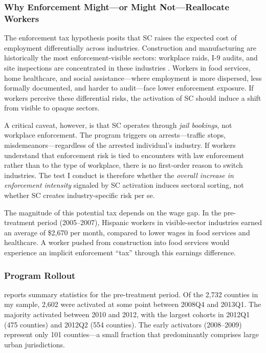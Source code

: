 \documentclass[12pt]{article}
\begin{document}
\subsubsection*{Why Enforcement Might---or Might Not---Reallocate Workers} The enforcement tax hypothesis posits that SC raises the expected cost of employment differentially across industries. Construction and manufacturing are historically the most enforcement-visible sectors: workplace raids, I-9 audits, and site inspections are concentrated in these industries \citep{borjas2017labor}. Workers in food services, home healthcare, and social assistance---where employment is more dispersed, less formally documented, and harder to audit---face lower enforcement exposure. If workers perceive these differential risks, the activation of SC should induce a shift from visible to opaque sectors.

A critical caveat, however, is that SC operates through \textit{jail bookings}, not workplace enforcement. The program triggers on arrests---traffic stops, misdemeanors---regardless of the arrested individual's industry. If workers understand that enforcement risk is tied to encounters with law enforcement rather than to the type of workplace, there is no first-order reason to switch industries. The test I conduct is therefore whether the \textit{overall increase in enforcement intensity} signaled by SC activation induces sectoral sorting, not whether SC creates industry-specific risk per se.

The magnitude of this potential tax depends on the wage gap. In the pre-treatment period (2005--2007), Hispanic workers in visible-sector industries earned an average of \$2,670 per month, compared to lower wages in food services and healthcare. A worker pushed from construction into food services would experience an implicit enforcement ``tax'' through this earnings difference.

\subsubsection*{Program Rollout}  reports summary statistics for the pre-treatment period. Of the 2,732 counties in my sample, 2,602 were activated at some point between 2008Q4 and 2013Q1. The majority activated between 2010 and 2012, with the largest cohorts in 2012Q1 (475 counties) and 2012Q2 (554 counties). The early activators (2008--2009) represent only 101 counties---a small fraction that predominantly comprises large urban jurisdictions.
\end{document}
